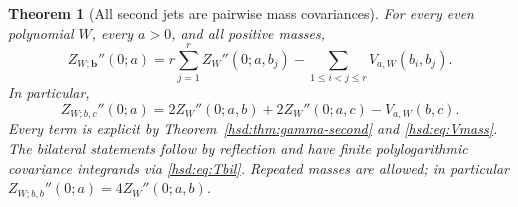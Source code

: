 \documentclass[11pt]{article}
\numberwithin{equation}{section}
\newtheorem{theorem}{Theorem}[section]
\theoremstyle{definition}\newtheorem{definition}[theorem]{Definition}
\theoremstyle{remark}\newtheorem{remark}[theorem]{Remark}
\begin{document}
\begin{theorem}[All second jets are pairwise mass covariances]
\label{hsd:thm:masses}
For every even polynomial $W$, every $a>0$, and all positive masses,
\begin{equation}\label{hsd:eq:many-second}
 \boxed{\displaystyle
 Z_{W;\mathbf b}''(0;a)=r\sum_{j=1}^r Z_W''(0;a,b_j)
                    -\sum_{1\le i<j\le r}V_{a,W}(b_i,b_j).}
\end{equation}
In particular,
\begin{equation}\label{hsd:eq:two-second}
 Z_{W;b,c}''(0;a)=2Z_W''(0;a,b)+2Z_W''(0;a,c)-V_{a,W}(b,c).
\end{equation}
Every term is explicit by Theorem~\ref{hsd:thm:gamma-second} and
\eqref{hsd:eq:Vmass}. The bilateral statements follow by reflection and
have finite polylogarithmic covariance integrands via
\eqref{hsd:eq:Tbil}. Repeated masses are allowed; in particular
$Z_{W;b,b}''(0;a)=4Z_W''(0;a,b)$.
\end{theorem}
\end{document}
